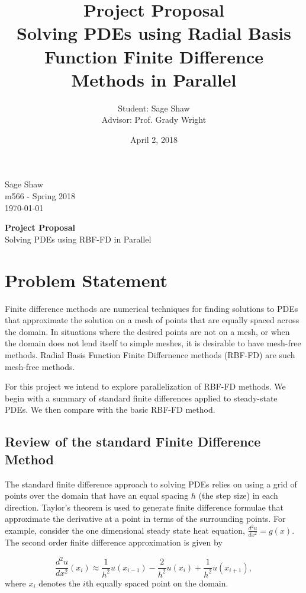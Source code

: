 \documentclass[12pt]{article}
\title{Project Proposal\\ \large Solving PDEs using Radial Basis Function Finite Difference Methods in Parallel}
\author{Student: Sage Shaw\\ Advisor: Prof. Grady Wright}
\date{April 2, 2018}
\begin{document}
	\thispagestyle{empty}
	
	\begin{flushright}
		Sage Shaw \\
		m566 - Spring 2018 \\
		\today
	\end{flushright}
	
	\begin{center}
		\Huge \textbf{Project Proposal} \\
		\large Solving PDEs using RBF-FD in Parallel
	\end{center}

\section{Problem Statement} 
Finite difference methods are numerical techniques for finding solutions to PDEs that approximate the solution on a mesh of points that are equally spaced across the domain. In situations where the desired points are not on a mesh, or when the domain does not lend itself to simple meshes, it is desirable to have mesh-free methods. Radial Basis Function Finite Differnence methods (RBF-FD) are such mesh-free methods. 

For this project we intend to explore parallelization of RBF-FD methods. We begin with a summary of standard finite differences applied to steady-state PDEs. We then compare with the basic RBF-FD method. 

\subsection{Review of the standard Finite Difference Method} 
The standard finite difference approach to solving PDEs relies on using a grid of points over the domain that have an equal spacing $h$ (the step size) in each direction. Taylor's theorem is used to generate finite difference formulae that approximate the derivative at a point in terms of the surrounding points. For example, consider the one dimensional steady state heat equation, $\frac{d^2u}{dx^2} = g(x)$. The second order finite difference approximation is given by

$$
\frac{d^2u}{dx^2}(x_i) \approx \frac{1}{h^2}u(x_{i-1}) - \frac{2}{h^2} u(x_i) + \frac{1}{h^2} u(x_{i+1}),
$$
where $x_i$ denotes the $i$th equally spaced point on the domain.
\end{document}
